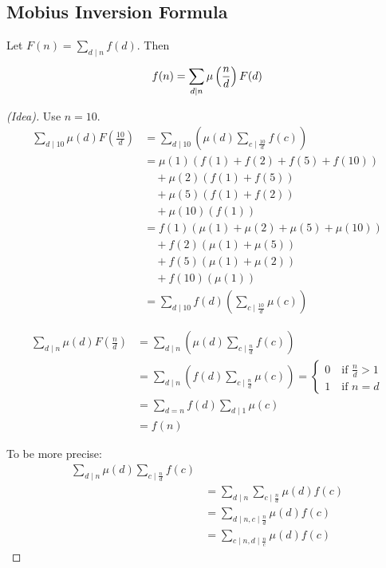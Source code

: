     \subsection{Mobius Inversion Formula}
    \begin{theorem} 
        Let $F(n) = \sum_{d\mid n}^{} f(d)$. Then 
        \[
            f(n) = \sum_{d\mid n}^{} \mu\left( \frac{n}{d} \right) F(d)
        \]
        \begin{proof} [(Idea)]
            Use $n = 10$.
            \begin{align*}
                \sum_{d\mid 10}^{} \mu(d)F(\frac{10}{d}) &= \sum_{d\mid 10}^{}(\mu(d)\sum_{c\mid \frac{10}{d}}^{}f(c)) \\
                &= \mu(1)(f(1)+f(2)+f(5)+f(10)) \\
                &\quad+ \mu(2)(f(1) + f(5)) \\
                &\quad+ \mu(5)(f(1) + f(2)) \\
                &\quad+ \mu(10)(f(1)) \\
                &= f(1)(\mu(1)+\mu(2)+\mu(5)+\mu(10)) \\
                &\quad+ f(2)(\mu(1)+\mu(5)) \\
                &\quad+ f(5)(\mu(1)+\mu(2)) \\
                &\quad+ f(10)(\mu(1)) \\
                &= \sum_{d\mid 10}^{} f(d)(\sum_{c\mid \frac{10}{d}}^{}\mu(c))
            \end{align*}

            \begin{align*}
                \sum_{d\mid n}^{} \mu(d)F(\frac{n}{d}) &= \sum_{d\mid n}^{} (\mu(d)\sum_{c\mid \frac{n}{d}}^{}f(c)) \\
                &= \sum_{d\mid n}^{} (f(d)\sum_{c\mid \frac{n}{d}}^{}\mu(c)) = 
                \begin{cases}
                    0 \quad\text{if } \frac{n}{d} > 1 \\
                    1 \quad\text{if } n = d
                \end{cases} \\
                &= \sum_{d=n}^{} f(d)\sum_{d\mid 1}^{}\mu(c) \\
                &= f(n)
            \end{align*}

            To be more precise:
            \begin{align*}
                \sum_{d\mid n}^{} \mu(d) \sum_{c\mid\frac{n}{d}}^{} f(c) \\
                &= \sum_{d\mid n}^{}\sum_{c\mid\frac{n}{d}}^{} \mu(d)f(c) \\
                &= \sum_{d\mid n, c\mid\frac{n}{d}}^{} \mu(d)f(c) \\
                &= \sum_{c\mid n, d\mid\frac{n}{c}}^{} \mu(d)f(c)
            \end{align*}
        \end{proof}
    \end{theorem}

